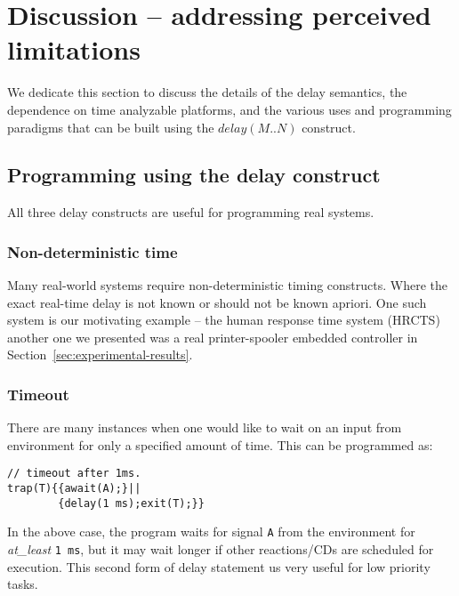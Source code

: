 \section{Discussion -- addressing perceived limitations}
\label{sec:disc-perc-limit}

We dedicate this section to discuss the details of the delay semantics,
the dependence on time analyzable platforms, and the various uses and
programming paradigms that can be built using the $delay(M..N)$
construct.

\subsection{Programming using the delay construct}
\label{sec:progr-using-delay}

All three delay constructs are useful for programming real systems. %

\subsubsection{Non-deterministic time}
\label{sec:non-determ-time}

Many real-world systems require non-deterministic timing
constructs. Where the exact real-time delay is not known or should not
be known apriori. One such system is our motivating example -- the human
response time system (HRCTS) another one we presented was a real
printer-spooler embedded controller in
Section~\ref{sec:experimental-results}.

\subsubsection{Timeout}
\label{sec:timeout}

There are many instances when one would like to wait on an input from
environment for only a specified amount of time. This can be programmed
as:
\begin{verbatim}
// timeout after 1ms.
trap(T){{await(A);}||
        {delay(1 ms);exit(T);}}
\end{verbatim}

In the above case, the program waits for signal \texttt{A} from the
environment for \textit{at\_least} \texttt{1 ms}, but it may wait longer
if other reactions/CDs are scheduled for execution. This second form of
delay statement us very useful for low priority tasks.

